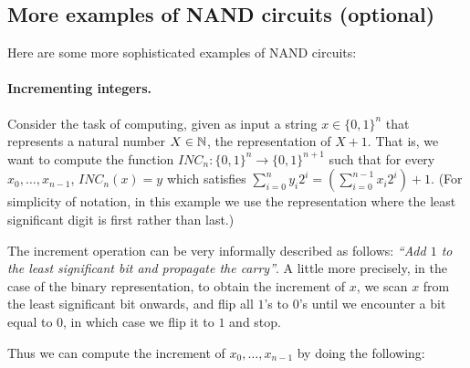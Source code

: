 \subsection{More examples of NAND circuits
(optional)}\label{More-examples-of-NAND-cir}

Here are some more sophisticated examples of NAND circuits:

\paragraph{Incrementing integers.} Consider the task of computing, given
as input a string \(x\in \{0,1\}^n\) that represents a natural number
\(X\in {\mathbb{N}}\), the representation of \(X+1\). That is, we want to compute
the function
\(\ensuremath{\mathit{INC}}_n:\{0,1\}^n \rightarrow \{0,1\}^{n+1}\) such
that for every \(x_0,\ldots,x_{n-1}\),
\(\ensuremath{\mathit{INC}}_n(x)=y\) which satisfies
\(\sum_{i=0}^n y_i 2^i = \left( \sum_{i=0}^{n-1} x_i 2^i \right)+1\).
(For simplicity of notation, in this example we use the representation
where the least significant digit is first rather than last.)

The increment operation can be very informally described as follows:
\emph{``Add \(1\) to the least significant bit and propagate the
carry''}. A little more precisely, in the case of the binary
representation, to obtain the increment of \(x\), we scan \(x\) from the
least significant bit onwards, and flip all \(1\)'s to \(0\)'s until we
encounter a bit equal to \(0\), in which case we flip it to \(1\) and
stop.

Thus we can compute the increment of \(x_0,\ldots,x_{n-1}\) by doing the
following:


